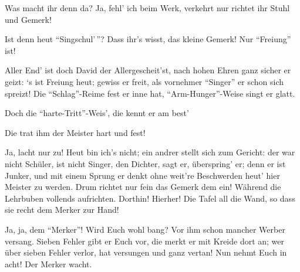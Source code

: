 \begin{drama}
\Davidspeaks
{}

Was macht ihr denn da? Ja, fehl' ich beim Werk,
verkehrt nur richtet ihr Stuhl und Gemerk! 


Ist denn heut ``Singschul'\,''? Dass ihr's wisst,
das kleine Gemerk! Nur ``Freiung'' ist!






Aller End' ist doch David der Allergescheit'st,
nach hohen Ehren ganz sicher er geizt:
‘s ist Freiung heut;
gewiss er freit,
als vornehmer ``Singer'' er schon sich spreizt!
Die ``Schlag''-Reime fest er inne hat,
``Arm-Hunger''-Weise singt er glatt.


Doch die ``harte-Tritt''-Weis', die kennt er am best'

Die trat ihm der Meister hart und fest!

\Davidspeaks

Ja, lacht nur zu! Heut bin ich's nicht;
ein andrer stellt sich zum Gericht:
der war nicht Schüler, ist nicht Singer,
den Dichter, sagt er, überspring' er;
denn er ist Junker, und mit einem Sprung er
denkt ohne weit're Beschwerden
heut' hier Meister zu werden.
Drum richtet nur fein das Gemerk dem ein!
Während die Lehrbuben vollends aufrichten.
Dorthin! Hierher! Die Tafel all die Wand,
so dass sie recht dem Merker zur Hand!


Ja, ja, dem ``Merker''! Wird Euch wohl bang?
Vor ihm schon mancher Werber versang.
Sieben Fehler gibt er Euch vor,
die merkt er mit Kreide dort an;
wer über sieben Fehler verlor,
hat versungen und ganz vertan!
Nun nehmt Euch in acht!
Der Merker wacht.


\end{drama}
